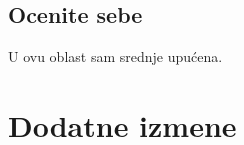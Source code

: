 \documentclass[a4paper]{report}
\begin{document}
\section{Ocenite sebe}
U ovu oblast sam srednje upućena.



\chapter{Dodatne izmene}
\end{document}
